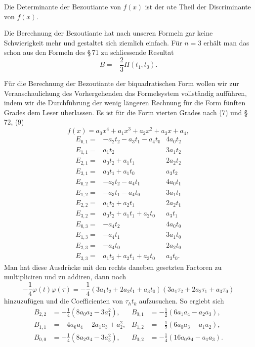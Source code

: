 \documentclass[11pt]{article}
\begin{document}
Die Determinante der Bezoutiante von $f(x)$ ist der $n$te Theil der Discriminante von $f(x)$.

Die Berechnung der Bezoutiante hat nach unseren Formeln gar keine Schwierigkeit mehr und gestaltet sich ziemlich einfach. Für $n=3$ erhält man das schon aus den Formeln des \S\,71 zu schliessende Resultat
\begin{equation}
 B=-\frac23H(t_1,t_0).
\tag{13}
\end{equation}

Für die Berechnung der Bezoutiante der biquadratischen Form wollen wir zur Veranschaulichung des Vorhergehenden das Formelsystem vollständig aufführen, indem wir die Durchführung der wenig längeren Rechnung für die Form fünften Grades dem Leser überlassen. Es ist für die Form vierten Grades nach (7) und \S\,72, (9)
\[
 f(x)=a_0x^4+a_1x^3+a_2x^2+a_3x+a_4,
\]
\[
\begin{array}{rl|l}
E_{0,1}={}&-a_2t_2-a_3t_1-a_4t_0&4a_0t_2\\
E_{1,1}={}&a_1t_2&3a_1t_2\\
E_{2,1}={}&a_0t_2+a_1t_1&2a_2t_2\\
E_{3,1}={}&a_0t_1+a_1t_0&a_3t_2\\ \hline
E_{0,2}={}&-a_3t_2-a_4t_1&4a_0t_1\\
E_{1,2}={}&-a_3t_1-a_4t_0&3a_1t_1\\
E_{2,2}={}&a_1t_2+a_2t_1&2a_2t_1\\
E_{3,2}={}&a_0t_2+a_1t_1+a_2t_0&a_3t_1\\ \hline
E_{0,3}={}&-a_4t_2&4a_0t_0\\
E_{1,3}={}&-a_4t_1&3a_1t_0\\
E_{2,3}={}&-a_4t_0&2a_2t_0\\
E_{3,3}={}&a_1t_2+a_2t_1+a_3t_0&a_3t_0.
\end{array}
\]
Man hat diese Ausdrücke mit den rechts daneben gesetzten Factoren zu multipliciren und zu addiren, dann noch
\[
 -\frac14\varphi(t)\varphi(\tau)
 =-\frac14(3a_1t_2+2a_2t_1+a_3t_0)(3a_1\tau_2+2a_2\tau_1+a_3\tau_0)
\]
hinzuzufügen und die Coefficienten von $\tau_ht_k$ aufzusuchen. So ergiebt sich
\begin{equation}
\begin{aligned}
B_{2,2}&=-\frac14(8a_0a_2-3a_1^2),&
B_{0,1}&=-\frac12(6a_1a_4-a_2a_3),\\
B_{1,1}&=-4a_0a_4-2a_1a_3+a_2^2,&
B_{1,2}&=-\frac12(6a_0a_3-a_1a_2),\\
B_{0,0}&=-\frac14(8a_2a_4-3a_3^2),&
B_{0,2}&=-\frac14(16a_0a_4-a_1a_3).
\end{aligned}
\tag{14}
\end{equation}
\end{document}
